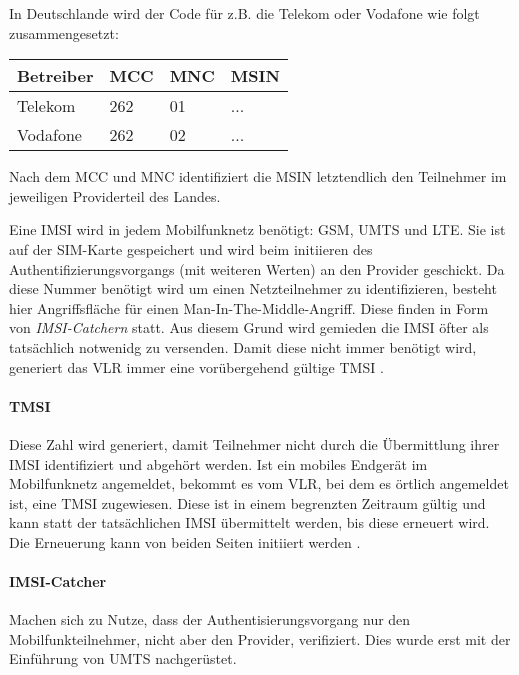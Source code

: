 In Deutschlande wird der Code für z.B. die Telekom oder Vodafone wie folgt zusammengesetzt:

    \begin{tabularx}{\textwidth}{|l||l|l|X|}
    \hline
      \textbf{Betreiber} & \textbf{MCC} & \textbf{MNC} & \textbf{MSIN} \\
    \hline
    \hline
      Telekom & 262 & 01 & ... \\
    \hline
    \hline
      Vodafone & 262 & 02 & ...\\
    \hline
    \end{tabularx}%

Nach dem \ac{MCC} und \ac{MNC} identifiziert die \ac{MSIN} letztendlich
den Teilnehmer im jeweiligen Providerteil des Landes.

Eine \ac{IMSI} wird in jedem Mobilfunknetz benötigt: \ac{GSM}, \ac{UMTS}
und \ac{LTE}. Sie ist auf der SIM-Karte gespeichert und wird beim
initiieren des Authentifizierungsvorgangs (mit weiteren Werten) an
den Provider geschickt. Da diese Nummer benötigt wird um einen Netzteilnehmer
zu identifizieren, besteht hier Angriffsfläche für einen Man-In-The-Middle-Angriff. Diese finden in Form von \textit{IMSI-Catchern} statt.
Aus diesem Grund wird gemieden die IMSI öfter als tatsächlich notwenidg
zu versenden. Damit diese nicht immer benötigt wird, generiert das
\ac{VLR} immer eine vorübergehend gültige \ac{TMSI} \cite{3gpp.33.003}.

\paragraph{TMSI} Diese Zahl wird generiert, damit Teilnehmer nicht
durch die Übermittlung ihrer \ac{IMSI} identifiziert und abgehört werden.
Ist ein mobiles Endgerät im Mobilfunknetz angemeldet, bekommt es vom
\ac{VLR}, bei dem es örtlich angemeldet ist, eine \ac{TMSI} zugewiesen.
Diese ist in einem begrenzten Zeitraum gültig und kann statt der
tatsächlichen \ac{IMSI} übermittelt werden, bis diese erneuert wird.
Die Erneuerung kann von beiden Seiten initiiert werden \cite{3gpp.33.003}.

\label{par:imsicatcher}
\paragraph{IMSI-Catcher} Machen sich zu Nutze, dass der
Authentisierungsvorgang nur den Mobilfunkteilnehmer, nicht aber den 
Provider, verifiziert. Dies wurde erst mit der Einführung von \ac{UMTS}
nachgerüstet.

